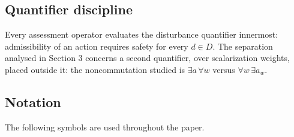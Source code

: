 \documentclass[3p,11pt]{elsarticle}
\begin{document}
\subsection{Quantifier discipline}\label{quantifier-discipline}

Every assessment operator evaluates the disturbance quantifier innermost: admissibility of an action requires safety for every \(d \in D\). The separation analysed in Section 3 concerns a second quantifier, over scalarization weights, placed outside it: the noncommutation studied is \(\exists a\, \forall w\) versus \(\forall w\, \exists a_w\).

\subsection{Notation}\label{notation}

The following symbols are used throughout the paper.
\end{document}
